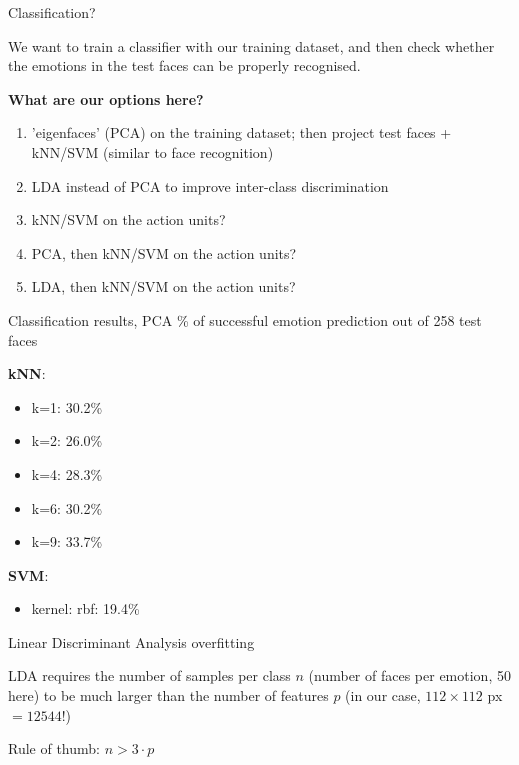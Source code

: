 \documentclass[compress]{beamer}
\begin{document}
\begin{frame}{Classification?}

    We want to train a classifier with our training dataset, and then check
    whether the emotions in the test faces can be properly recognised.

    \begin{center}
        {\bf What are our options here?}
    \end{center}

    \pause

    \begin{enumerate}
        \item<+-> 'eigenfaces' (PCA) on the training dataset; then project test
            faces +
            kNN/SVM (\ie similar to face recognition)
        \item<+-> LDA instead of PCA to improve inter-class discrimination
        \item<+-> kNN/SVM on the action units?
        \item<+-> PCA, then kNN/SVM on the action units?
        \item<+-> LDA, then kNN/SVM on the action units?
    \end{enumerate}
\end{frame}

\begin{frame}{Classification results, PCA}
    \% of successful emotion prediction out of 258 test faces

    {\bf kNN}:
    \begin{itemize}
        \item k=1: 30.2\%
        \item k=2: 26.0\%
        \item k=4: 28.3\%
        \item k=6: 30.2\%
        \item k=9: 33.7\%
    \end{itemize}

    {\bf SVM}:

    \begin{itemize}
            \item kernel: rbf: 19.4\%
    \end{itemize}
\end{frame}


\begin{frame}{Linear Discriminant Analysis overfitting}

    LDA requires the number of samples per class $n$ (\ie number of faces per
    emotion, 50 here) to be much larger than the number of features $p$ (in our case,
    $112\times 112$ px $= 12544$!)

    Rule of thumb: $n > 3\cdot p$
\end{frame}
\end{document}
